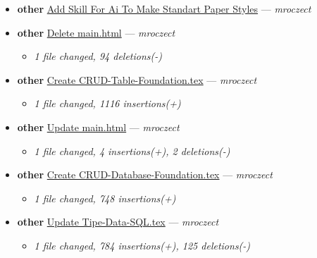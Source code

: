 \begin{itemize}[leftmargin=1.5em]
  \begin{itemize}[leftmargin=1.5em]
    \item \small\textit{1 file changed, 291 insertions(+), 31 deletions(-)}
  \end{itemize}
  \item \textbf{other} \href{https://github.com/mroczect/mroczect.github.io/commit/39c83531e7ebc13577b95c66f544efd4deae17c5}{Add Skill For Ai To Make Standart Paper Styles} --- \textit{mroczect}
  \item \textbf{other} \href{https://github.com/mroczect/mroczect.github.io/commit/9227b3642d14f479adaa54628b25f9c552b4157b}{Delete main.html} --- \textit{mroczect}
  \begin{itemize}[leftmargin=1.5em]
    \item \small\textit{1 file changed, 94 deletions(-)}
  \end{itemize}
  \item \textbf{other} \href{https://github.com/mroczect/mroczect.github.io/commit/7f7f416a6203e776ed19d9203f58d91d2d365716}{Create CRUD-Table-Foundation.tex} --- \textit{mroczect}
  \begin{itemize}[leftmargin=1.5em]
    \item \small\textit{1 file changed, 1116 insertions(+)}
  \end{itemize}
  \item \textbf{other} \href{https://github.com/mroczect/mroczect.github.io/commit/2837d052840ccf1043beb6635422e06235cdfe78}{Update main.html} --- \textit{mroczect}
  \begin{itemize}[leftmargin=1.5em]
    \item \small\textit{1 file changed, 4 insertions(+), 2 deletions(-)}
  \end{itemize}
  \item \textbf{other} \href{https://github.com/mroczect/mroczect.github.io/commit/1da93bb451a3f55fa9f916d82d9ece9b32a33cee}{Create CRUD-Database-Foundation.tex} --- \textit{mroczect}
  \begin{itemize}[leftmargin=1.5em]
    \item \small\textit{1 file changed, 748 insertions(+)}
  \end{itemize}
  \item \textbf{other} \href{https://github.com/mroczect/mroczect.github.io/commit/756248ff993e035eba655489ef72f45230018e99}{Update Tipe-Data-SQL.tex} --- \textit{mroczect}
  \begin{itemize}[leftmargin=1.5em]
    \item \small\textit{1 file changed, 784 insertions(+), 125 deletions(-)}

\end{itemize}
\end{itemize}
